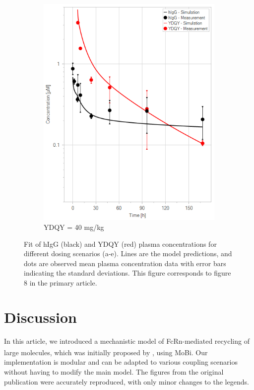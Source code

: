 \documentclass[fleqn,10pt]{physiome}
\begin{document}
\begin{figure}[htb]
\begin{subfigure}{0.32\textwidth}
        \includegraphics[width=\textwidth]{pl15.png}
        \caption{YDQY = 40 mg/kg}
        \label{fig:7e}
    \end{subfigure}
    \caption{Fit of hIgG (black) and YDQY (red) plasma concentrations for different dosing scenarios (a-e). Lines are the model predictions, and dots are observed mean plasma concentration data with error bars indicating the standard deviations. This figure corresponds to figure 8 in the primary article.}
    \label{fig:7}
\end{figure}


\section{Discussion}

In this article, we introduced a mechanistic model of FcRn-mediated recycling of large molecules, which was initially proposed by \cite{de2023mechanistic}, using MoBi\textsuperscript{\textregistered}. Our implementation is modular and can be adapted to various coupling scenarios without having to modify the main model. The figures from the original publication were accurately reproduced, with only minor changes to the legends. 
\end{document}
